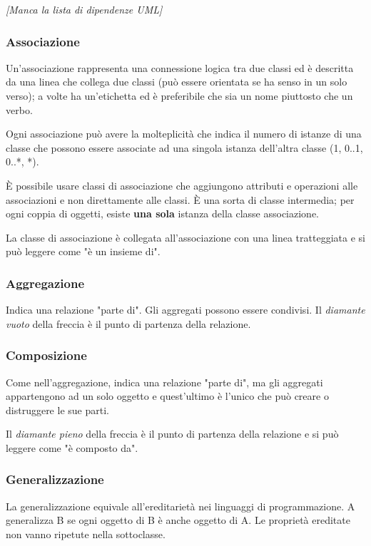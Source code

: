 \textit{[Manca la lista di dipendenze UML]}

\subsubsection{Associazione}
Un'associazione rappresenta una connessione logica tra due classi ed è descritta da una linea che collega due classi 
(può essere orientata se ha senso in un solo verso); a volte ha un'etichetta ed è preferibile che sia un nome piuttosto che un verbo.

Ogni associazione può avere la molteplicità che indica il numero di istanze di una classe che possono essere associate ad una singola istanza dell'altra classe (1, 0..1, 0..*, *).

\`E possibile usare classi di associazione che aggiungono attributi e operazioni alle associazioni e non direttamente alle classi. 
\`E una sorta di classe intermedia; per ogni coppia di oggetti, esiste \textbf{una sola} istanza della classe associazione. 

La classe di associazione è collegata all'associazione con una linea tratteggiata e si può leggere come "è un insieme di".

\subsubsection{Aggregazione}
Indica una relazione "parte di". Gli aggregati possono essere condivisi. Il \textit{diamante vuoto} della freccia è il punto di partenza della relazione.

\subsubsection{Composizione}
Come nell'aggregazione, indica una relazione "parte di", ma gli aggregati appartengono ad un solo oggetto e quest'ultimo è l'unico che può creare o distruggere le sue parti. 

Il \textit{diamante pieno} della freccia è il punto di partenza della relazione e si può leggere come "è composto da".

\subsubsection{Generalizzazione}
La generalizzazione equivale all'ereditarietà nei linguaggi di programmazione. 
A generalizza B se ogni oggetto di B è anche oggetto di A. Le proprietà ereditate non vanno ripetute nella sottoclasse.

